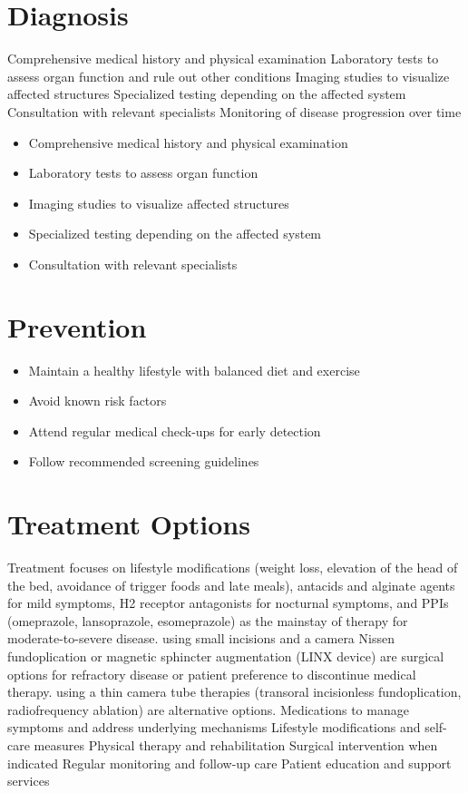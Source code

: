 \section{Diagnosis}
Comprehensive medical history and physical examination Laboratory tests to assess organ function and rule out other conditions Imaging studies to visualize affected structures Specialized testing depending on the affected system Consultation with relevant specialists Monitoring of disease progression over time

\begin{itemize}[noitemsep]
  \item Comprehensive medical history and physical examination
  \item Laboratory tests to assess organ function
  \item Imaging studies to visualize affected structures
  \item Specialized testing depending on the affected system
  \item Consultation with relevant specialists
\end{itemize}
\section{Prevention}
\begin{itemize}[noitemsep]
  \item Maintain a healthy lifestyle with balanced diet and exercise
  \item Avoid known risk factors
  \item Attend regular medical check-ups for early detection
  \item Follow recommended screening guidelines
\end{itemize}
\section{Treatment Options}
Treatment focuses on lifestyle modifications (weight loss, elevation of the head of the bed, avoidance of trigger foods and late meals), antacids and alginate agents for mild symptoms, H2 receptor antagonists for nocturnal symptoms, and PPIs (omeprazole, lansoprazole, esomeprazole) as the mainstay of therapy for moderate-to-severe disease. using small incisions and a camera Nissen fundoplication or magnetic sphincter augmentation (LINX device) are surgical options for refractory disease or patient preference to discontinue medical therapy. using a thin camera tube therapies (transoral incisionless fundoplication, radiofrequency ablation) are alternative options. Medications to manage symptoms and address underlying mechanisms Lifestyle modifications and self-care measures Physical therapy and rehabilitation Surgical intervention when indicated Regular monitoring and follow-up care Patient education and support services

